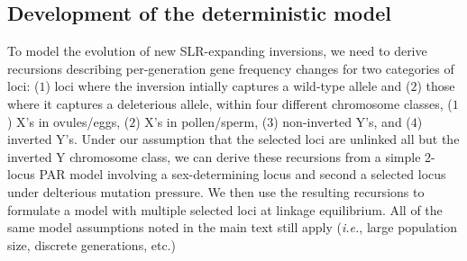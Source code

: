 \documentclass{article}
\begin{document}
\begin{appendices}



\section{Development of the deterministic model} \label{DetermModel-App}
 \renewcommand{\theequation}{B\arabic{equation}}
 \setcounter{equation}{0}
 \renewcommand{\thefigure}{B\arabic{figure}}
 \setcounter{figure}{0}

To model the evolution of new SLR-expanding inversions, we need to derive recursions describing per-generation gene frequency changes for two categories of loci: ($1$) loci where the inversion intially captures a wild-type allele and ($2$) those where it captures a deleterious allele, within four different chromosome classes, ($1$) X's in ovules/eggs, ($2$) X's in pollen/sperm, ($3$) non-inverted Y's, and ($4$) inverted Y's. Under our assumption that the selected loci are unlinked all but the inverted Y chromosome class, we can derive these recursions from a simple 2-locus PAR model involving a sex-determining locus and second a selected locus under delterious mutation pressure. We then use the resulting recursions to formulate a model with multiple selected loci at linkage equilibrium. All of the same model assumptions noted in the main text still apply ({\itshape i.e.}, large population size, discrete generations, etc.)



\end{appendices}
\end{document}
